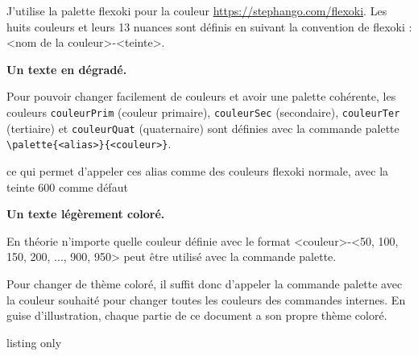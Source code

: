 

J'utilise la palette flexoki pour la couleur \url{https://stephango.com/flexoki}. 
Les huits couleurs et leurs 13 nuances sont définis en suivant la convention de flexoki : <nom de la couleur>-<teinte>.
\begin{boiteCodeTex}{}
  \bfseries \textcolor{blue-200}{Un}
  \textcolor{blue-400}{texte}
  \textcolor{blue-600}{en}
  \textcolor{blue-800}{dégradé}.
\end{boiteCodeTex}



Pour pouvoir changer facilement de couleurs et avoir une palette cohérente, les couleurs \lstinline|couleurPrim| (couleur primaire), \lstinline|couleurSec| (secondaire), \lstinline|couleurTer| (tertiaire) et \lstinline|couleurQuat| (quaternaire) sont définies avec la commande palette \lstinline|\palette{<alias>}{<couleur>}|.

ce qui permet d'appeler ces alias comme des couleurs flexoki normale, avec la teinte 600 comme défaut
\begin{boiteCodeTex}{}
  \bfseries
  \textcolor{couleurPrim}{Un}
  \textcolor{couleurSec-700}{texte}
  \textcolor{couleurTer}{légèrement}
  \textcolor{couleurQuat}{coloré}.
\end{boiteCodeTex}
En théorie n'importe quelle couleur définie avec le format <couleur>-<50, 100, 150, 200, ..., 900, 950> peut être utilisé avec la commande palette.

Pour changer de thème coloré, il suffit donc d'appeler la commande palette avec la couleur souhaité pour changer toutes les couleurs des commandes internes.
En guise d'illustration, chaque partie de ce document a son propre thème coloré.

\begin{boiteCodeTex}{listing only}
\end{boiteCodeTex}
